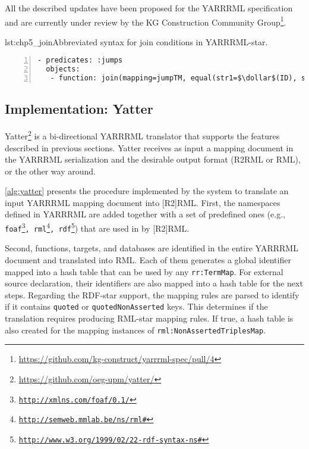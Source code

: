 All the described updates have been proposed for the YARRRML specification and are currently under review by the KG Construction Community Group\footnote{\url{https://github.com/kg-construct/yarrrml-spec/pull/4}}.

\begin{minipage}{\linewidth}
\centering
\begin{captionedlisting}{lst:chp5_join}{Abbreviated syntax for join conditions in YARRRML-star.}
\centering
{\begin{lstlisting}[numbers=left,basicstyle=\ttfamily\small,columns=flexible,language=yarrrmlstar]
- predicates: :jumps
  objects:
   - function: join(mapping=jumpTM, equal(str1=$\dollar$(ID), str2=$\dollar$(ID)))
\end{lstlisting}}
\end{captionedlisting}
\end{minipage}





\subsection{Implementation: Yatter}

Yatter\footnote{\label{foot:yatter}\url{https://github.com/oeg-upm/yatter/}} is a bi-directional YARRRML translator that supports the features described in previous sections. 
Yatter receives as input a mapping document in the YARRRML serialization and the desirable output format (R2RML or RML), or the other way around.




\cref{alg:yatter} presents the procedure implemented by the system to translate an input YARRRML mapping document into [R2]RML. 
First, %
the namespaces defined in YARRRML are added together with a set of predefined ones (e.g., \texttt{foaf\footnote{\url{http://xmlns.com/foaf/0.1/}}, rml\footnote{\url{http://semweb.mmlab.be/ns/rml\#}}, rdf\footnote{\url{http://www.w3.org/1999/02/22-rdf-syntax-ns\#}}}) that are used in by [R2]RML. 

Second, functions, targets, and databases are identified in the entire YARRRML document and translated into RML. Each of them generates a global identifier mapped into a hash table that can be used by any \texttt{rr:TermMap}. For external source declaration, their identifiers are also mapped into a hash table for the next steps.
Regarding the RDF-star support, the mapping rules are parsed to identify if it contains \texttt{quoted} or \texttt{quotedNonAsserted} keys.
This determines if the translation requires producing RML-star mapping rules.
If true, a hash table is also created for the mapping instances of \texttt{rml:NonAssertedTriplesMap}.


